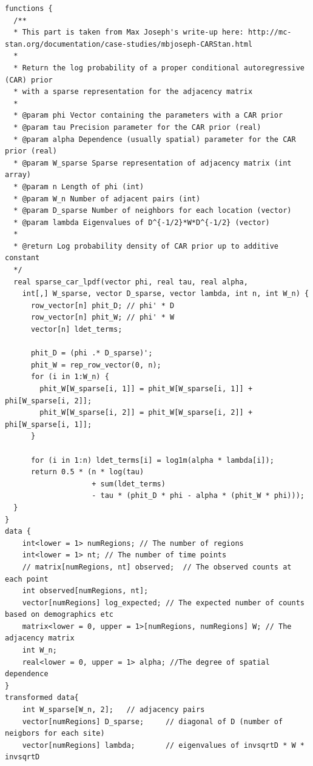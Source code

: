\documentclass[11pt]{report}
\begin{document}
\begin{verbatim}
functions {
  /**
  * This part is taken from Max Joseph's write-up here: http://mc-stan.org/documentation/case-studies/mbjoseph-CARStan.html
  *
  * Return the log probability of a proper conditional autoregressive (CAR) prior 
  * with a sparse representation for the adjacency matrix
  *
  * @param phi Vector containing the parameters with a CAR prior
  * @param tau Precision parameter for the CAR prior (real)
  * @param alpha Dependence (usually spatial) parameter for the CAR prior (real)
  * @param W_sparse Sparse representation of adjacency matrix (int array)
  * @param n Length of phi (int)
  * @param W_n Number of adjacent pairs (int)
  * @param D_sparse Number of neighbors for each location (vector)
  * @param lambda Eigenvalues of D^{-1/2}*W*D^{-1/2} (vector)
  *
  * @return Log probability density of CAR prior up to additive constant
  */
  real sparse_car_lpdf(vector phi, real tau, real alpha, 
    int[,] W_sparse, vector D_sparse, vector lambda, int n, int W_n) {
      row_vector[n] phit_D; // phi' * D
      row_vector[n] phit_W; // phi' * W
      vector[n] ldet_terms;
    
      phit_D = (phi .* D_sparse)';
      phit_W = rep_row_vector(0, n);
      for (i in 1:W_n) {
        phit_W[W_sparse[i, 1]] = phit_W[W_sparse[i, 1]] + phi[W_sparse[i, 2]];
        phit_W[W_sparse[i, 2]] = phit_W[W_sparse[i, 2]] + phi[W_sparse[i, 1]];
      }
    
      for (i in 1:n) ldet_terms[i] = log1m(alpha * lambda[i]);
      return 0.5 * (n * log(tau)
                    + sum(ldet_terms)
                    - tau * (phit_D * phi - alpha * (phit_W * phi)));
  }
}
data {
    int<lower = 1> numRegions; // The number of regions
    int<lower = 1> nt; // The number of time points
    // matrix[numRegions, nt] observed;  // The observed counts at each point
    int observed[numRegions, nt];
    vector[numRegions] log_expected; // The expected number of counts based on demographics etc
    matrix<lower = 0, upper = 1>[numRegions, numRegions] W; // The adjacency matrix
    int W_n;
    real<lower = 0, upper = 1> alpha; //The degree of spatial dependence
}
transformed data{
    int W_sparse[W_n, 2];   // adjacency pairs
    vector[numRegions] D_sparse;     // diagonal of D (number of neigbors for each site)
    vector[numRegions] lambda;       // eigenvalues of invsqrtD * W * invsqrtD
    

\end{verbatim}
\end{document}
